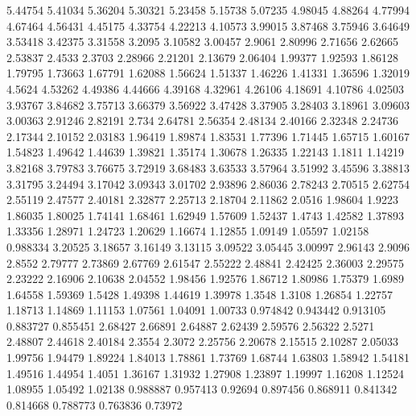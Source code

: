 5.44754      5.41034      5.36204      5.30321      5.23458      5.15738      5.07235      4.98045      4.88264      4.77994      4.67464      4.56431      4.45175      4.33754      4.22213      4.10573      3.99015      3.87468      3.75946      3.64649      3.53418      3.42375      3.31558      3.2095      3.10582      3.00457      2.9061      2.80996      2.71656      2.62665      2.53837      2.4533      2.3703      2.28966      2.21201      2.13679      2.06404      1.99377      1.92593      1.86128      1.79795      1.73663      1.67791      1.62088      1.56624      1.51337      1.46226      1.41331      1.36596      1.32019      
4.5624      4.53262      4.49386      4.44666      4.39168      4.32961      4.26106      4.18691      4.10786      4.02503      3.93767      3.84682      3.75713      3.66379      3.56922      3.47428      3.37905      3.28403      3.18961      3.09603      3.00363      2.91246      2.82191      2.734      2.64781      2.56354      2.48134      2.40166      2.32348      2.24736      2.17344      2.10152      2.03183      1.96419      1.89874      1.83531      1.77396      1.71445      1.65715      1.60167      1.54823      1.49642      1.44639      1.39821      1.35174      1.30678      1.26335      1.22143      1.1811      1.14219      
3.82168      3.79783      3.76675      3.72919      3.68483      3.63533      3.57964      3.51992      3.45596      3.38813      3.31795      3.24494      3.17042      3.09343      3.01702      2.93896      2.86036      2.78243      2.70515      2.62754      2.55119      2.47577      2.40181      2.32877      2.25713      2.18704      2.11862      2.0516      1.98604      1.9223      1.86035      1.80025      1.74141      1.68461      1.62949      1.57609      1.52437      1.4743      1.42582      1.37893      1.33356      1.28971      1.24723      1.20629      1.16674      1.12855      1.09149      1.05597      1.02158      0.988334      
3.20525      3.18657      3.16149      3.13115      3.09522      3.05445      3.00997      2.96143      2.9096      2.8552      2.79777      2.73869      2.67769      2.61547      2.55222      2.48841      2.42425      2.36003      2.29575      2.23222      2.16906      2.10638      2.04552      1.98456      1.92576      1.86712      1.80986      1.75379      1.6989      1.64558      1.59369      1.5428      1.49398      1.44619      1.39978      1.3548      1.3108      1.26854      1.22757      1.18713      1.14869      1.11153      1.07561      1.04091      1.00733      0.974842      0.943442      0.913105      0.883727      0.855451      
2.68427      2.66891      2.64887      2.62439      2.59576      2.56322      2.5271      2.48807      2.44618      2.40184      2.3554      2.3072      2.25756      2.20678      2.15515      2.10287      2.05033      1.99756      1.94479      1.89224      1.84013      1.78861      1.73769      1.68744      1.63803      1.58942      1.54181      1.49516      1.44954      1.4051      1.36167      1.31932      1.27908      1.23897      1.19997      1.16208      1.12524      1.08955      1.05492      1.02138      0.988887      0.957413      0.92694      0.897456      0.868911      0.841342      0.814668      0.788773      0.763836      0.73972      
